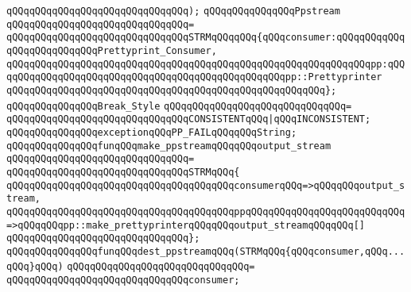 \verb|qQQqqQQqqQQqqQQqqQQqqQQqqQQqqQQq);|\newline
\newline
\verb|qQQqqQQqqQQqqQQqPpstream|\newline
\verb|qQQqqQQqqQQqqQQqqQQqqQQqqQQqqQQq=|\newline
\verb|qQQqqQQqqQQqqQQqqQQqqQQqqQQqqQQqSTRMqQQqqQQq{qQQqconsumer:qQQqqQQqqQQqqQQqqQQqqQQqqQQqPrettyprint_Consumer,|\newline
\verb|qQQqqQQqqQQqqQQqqQQqqQQqqQQqqQQqqQQqqQQqqQQqqQQqqQQqqQQqqQQqqQQqpp:qQQqqQQqqQQqqQQqqQQqqQQqqQQqqQQqqQQqqQQqqQQqqQQqqQQqpp::Prettyprinter|\newline
\verb|qQQqqQQqqQQqqQQqqQQqqQQqqQQqqQQqqQQqqQQqqQQqqQQqqQQqqQQq};|\newline
\newline
\newline
\verb|qQQqqQQqqQQqqQQqBreak_Style|\newline
\verb|qQQqqQQqqQQqqQQqqQQqqQQqqQQqqQQq=|\newline
\verb|qQQqqQQqqQQqqQQqqQQqqQQqqQQqqQQqCONSISTENTqQQq|\verb#|qQQqINCONSISTENT;#\newline
\newline
\newline
\verb|qQQqqQQqqQQqqQQqexceptionqQQqPP_FAILqQQqqQQqString;|\newline
\newline
\newline
\verb|qQQqqQQqqQQqqQQqfunqQQqmake_ppstreamqQQqqQQqoutput_stream|\newline
\verb|qQQqqQQqqQQqqQQqqQQqqQQqqQQqqQQq=|\newline
\verb|qQQqqQQqqQQqqQQqqQQqqQQqqQQqqQQqSTRMqQQq{|\newline
\verb|qQQqqQQqqQQqqQQqqQQqqQQqqQQqqQQqqQQqqQQqconsumerqQQq=>qQQqqQQqoutput_stream,|\newline
\verb|qQQqqQQqqQQqqQQqqQQqqQQqqQQqqQQqqQQqqQQqppqQQqqQQqqQQqqQQqqQQqqQQqqQQq=>qQQqqQQqpp::make_prettyprinterqQQqqQQqoutput_streamqQQqqQQq[]|\newline
\verb|qQQqqQQqqQQqqQQqqQQqqQQqqQQqqQQq};|\newline
\newline
\newline
\verb|qQQqqQQqqQQqqQQqfunqQQqdest_ppstreamqQQq(STRMqQQq{qQQqconsumer,qQQq...qQQq}qQQq)|\newline
\verb|qQQqqQQqqQQqqQQqqQQqqQQqqQQqqQQq=|\newline
\verb|qQQqqQQqqQQqqQQqqQQqqQQqqQQqqQQqconsumer;|\newline
